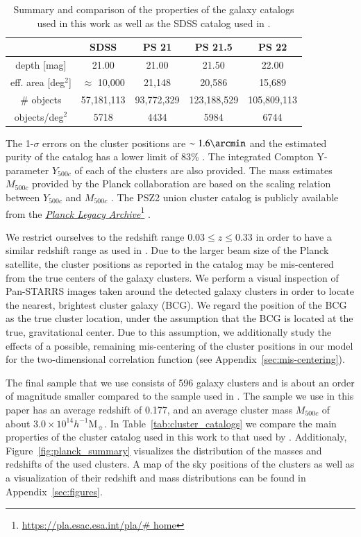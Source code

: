 \documentclass[iop, apjl, twocolappendix, numberedappendix]{emulateapj}
\newcommand\fnurl[2]{%
  \href{#2}{#1}\footnote{\url{#2}}%
}
\begin{document}
\begin{table}
    \centering
    \caption{Summary and comparison of the properties of the galaxy catalogs used in this work as well as the SDSS catalog used in \citet{more2016detection}.}
    \label{tab:galaxy_catalogs}
    \begin{tabular}{ccccc}
    \hline 
    & SDSS & PS 21 & PS 21.5 & PS 22 \\ 
    \hline 
    depth [mag] & 21.00 & 21.00 & 21.50 & 22.00\\ 
    \hline 
    eff. area [deg$^2$] & $\approx$ 10,000 & 21,148 & 20,586 & 15,689\\ 
    \hline 
    \# objects & 57,181,113 & 93,772,329 & 123,188,529 & 105,809,113 \\
    \hline
    objects/deg$^2$ & 5718 & 4434 & 5984 & 6744\\ 
    \hline
    \end{tabular} 
\end{table}


The 1-$\sigma$ errors on the cluster positions are $\sim1.6\arcmin$
and the estimated purity of the catalog has a lower limit of 83\%
\citep{ade2016psclusters}. The integrated Compton Y-parameter
$Y_{500c}$ of each of the clusters are also provided. The mass
estimates $M_{500c}$ provided by the Planck collaboration are based on
the scaling relation between $Y_{500c}$ and $M_{500c}$
\citep{ade2014planck,adam2016planck,collaboration2016planck}. The PSZ2
union cluster catalog is publicly available from the
\fnurl{\textit{Planck Legacy Archive}}{https://pla.esac.esa.int/pla/\#
home}.

We restrict ourselves to the redshift range $0.03 \leq z \leq 0.33$ in 
order to have a similar redshift range as used in \citet{more2016detection}. 
Due to the larger beam size of the Planck
satellite, the cluster positions as reported in the catalog may be
mis-centered from the true centers of the galaxy clusters. We perform
a visual inspection of Pan-STARRS images taken around the detected
galaxy clusters in order to locate the nearest, brightest cluster
galaxy (BCG). We regard the position of the BCG as the true cluster
location, under the assumption that the BCG is located at the true,
gravitational center. Due to this assumption, we additionally 
study the effects of a possible, remaining mis-centering of the 
cluster positions in our model for the two-dimensional correlation 
function (see Appendix~\ref{sec:mis-centering}). 

The final sample that we use consists of 596
galaxy clusters and is about an order of magnitude smaller compared
to the sample used in \citet{more2016detection}. The sample we use
in this paper has an average redshift of 0.177, and an average
cluster mass $M_{500c}$ of about $3.0 \times 10^{14}
h^{-1}$M$_{\sun}$. In Table~\ref{tab:cluster_catalogs} we compare
the main properties of the cluster catalog used in this work to that
used by \citet{more2016detection}. Additionaly, Figure~\ref{fig:planck_summary}
visualizes the distribution of the masses and redshifts of the used clusters.
A map of the sky positions of the clusters as well as a visualization of their redshift and mass distributions
can be found in Appendix~\ref{sec:figures}. 
\end{document}
